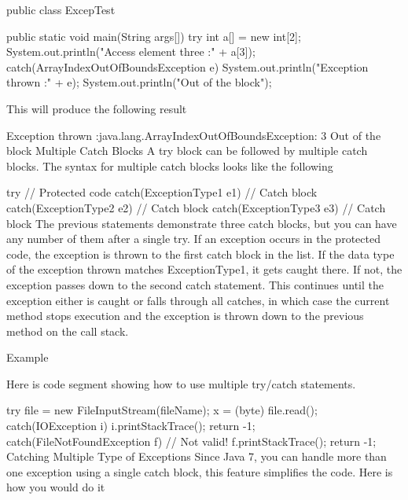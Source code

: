 public class ExcepTest {

   public static void main(String args[]) {
      try {
         int a[] = new int[2];
         System.out.println("Access element three :" + a[3]);
      }catch(ArrayIndexOutOfBoundsException e) {
         System.out.println("Exception thrown  :" + e);
      }
      System.out.println("Out of the block");
   }
}
This will produce the following result

Exception thrown  :java.lang.ArrayIndexOutOfBoundsException: 3
Out of the block
Multiple Catch Blocks
A try block can be followed by multiple catch blocks. The syntax for multiple catch blocks looks like the following

try {
   // Protected code
}catch(ExceptionType1 e1) {
   // Catch block
}catch(ExceptionType2 e2) {
   // Catch block
}catch(ExceptionType3 e3) {
   // Catch block
}
The previous statements demonstrate three catch blocks, but you can have any number of them after a single try. If an exception occurs in the protected code, the exception is thrown to the first catch block in the list. If the data type of the exception thrown matches ExceptionType1, it gets caught there. If not, the exception passes down to the second catch statement. This continues until the exception either is caught or falls through all catches, in which case the current method stops execution and the exception is thrown down to the previous method on the call stack.

Example

Here is code segment showing how to use multiple try/catch statements.

try {
   file = new FileInputStream(fileName);
   x = (byte) file.read();
}catch(IOException i) {
   i.printStackTrace();
   return -1;
}catch(FileNotFoundException f) // Not valid! {
   f.printStackTrace();
   return -1;
}
Catching Multiple Type of Exceptions
Since Java 7, you can handle more than one exception using a single catch block, this feature simplifies the code. Here is how you would do it

